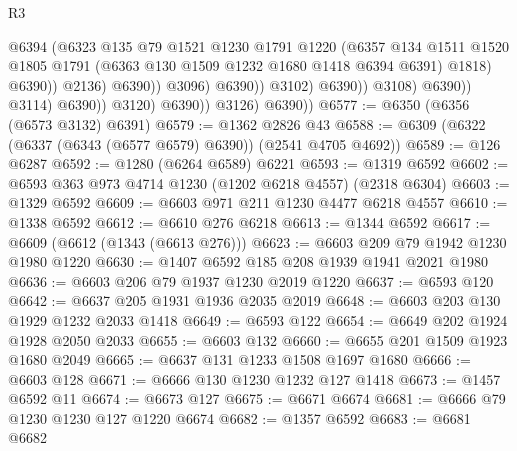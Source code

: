 \begin{lexlean}{R3}
\begin{coremodule}
                                                @6394
                                                (@6323
                                                  @135
                                                  @79
                                                  @1521
                                                  @1230
                                                  @1791
                                                  @1220
                                                  (@6357
                                                    @134
                                                    @1511
                                                    @1520
                                                    @1805
                                                    @1791
                                                    (@6363 @130 @1509 @1232 @1680 @1418 @6394 @6391)
                                                    @1818)
                                                  @6390))
                                              @2136)
                                            @6390))
                                        @3096)
                                      @6390))
                                  @3102)
                                @6390))
                            @3108)
                          @6390))
                      @3114)
                    @6390))
                @3120)
              @6390))
          @3126)
        @6390))
@6577 := @6350 (@6356 (@6573 @3132) @6391)
@6579 := @1362 @2826 @43
@6588 := @6309 (@6322 (@6337 (@6343 (@6577 @6579) @6390)) (@2541 @4705 @4692))
@6589 := @126 @6287
@6592 := @1280 (@6264 @6589) @6221
@6593 := @1319 @6592
@6602 := @6593 @363 @973 @4714 @1230 (@1202 @6218 @4557) (@2318 @6304)
@6603 := @1329 @6592
@6609 := @6603 @971 @211 @1230 @4477 @6218 @4557
@6610 := @1338 @6592
@6612 := @6610 @276 @6218
@6613 := @1344 @6592
@6617 := @6609 (@6612 (@1343 (@6613 @276)))
@6623 := @6603 @209 @79 @1942 @1230 @1980 @1220
@6630 := @1407 @6592 @185 @208 @1939 @1941 @2021 @1980
@6636 := @6603 @206 @79 @1937 @1230 @2019 @1220
@6637 := @6593 @120
@6642 := @6637 @205 @1931 @1936 @2035 @2019
@6648 := @6603 @203 @130 @1929 @1232 @2033 @1418
@6649 := @6593 @122
@6654 := @6649 @202 @1924 @1928 @2050 @2033
@6655 := @6603 @132
@6660 := @6655 @201 @1509 @1923 @1680 @2049
@6665 := @6637 @131 @1233 @1508 @1697 @1680
@6666 := @6603 @128
@6671 := @6666 @130 @1230 @1232 @127 @1418
@6673 := @1457 @6592 @11
@6674 := @6673 @127
@6675 := @6671 @6674
@6681 := @6666 @79 @1230 @1230 @127 @1220 @6674
@6682 := @1357 @6592
@6683 := @6681 @6682

\end{coremodule}
\end{lexlean}
